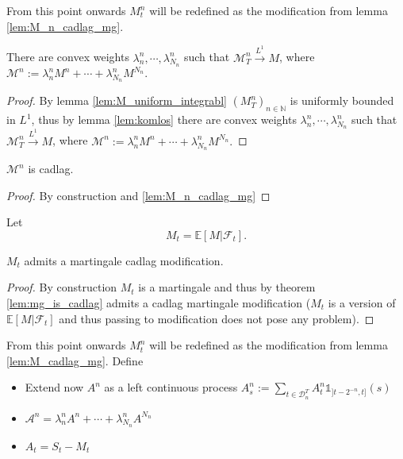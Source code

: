From this point onwards $M^n_t$ will be redefined as the modification from lemma \ref{lem:M_n_cadlag_mg}.
\begin{lemma}\label{lem:M_cal_converges_L1}
  There are convex weights $\lambda^n_n,\cdots,\lambda^n_{N_n}$ such that
  $\mathcal{M}^n_T\stackrel{L^1}{\rightarrow}M$, where $\mathcal{M}^n:=\lambda^n_nM^n+\cdots +\lambda^n_{N_n}M^{N_n}.$
\end{lemma}
\begin{proof}
  By lemma \ref{lem:M_uniform_integrabl} $(M^n_T)_{n\in\mathbb{N}}$ is uniformly bounded in $L^1$, thus by lemma \ref{lem:komlos} there are convex weights $\lambda^n_n,\cdots,\lambda^n_{N_n}$ such that
  $\mathcal{M}^n_T\stackrel{L^1}{\rightarrow}M$, where $\mathcal{M}^n:=\lambda^n_nM^n+\cdots +\lambda^n_{N_n}M^{N_n}.$
\end{proof}

\begin{lemma}\label{lem:M_cal_cadlag}
  $\mathcal{M}^n$ is cadlag.
\end{lemma}
\begin{proof}
  By construction and \ref{lem:M_n_cadlag_mg}
\end{proof}

Let \begin{equation}\label{equation_DM_e6} M_t = \mathbb{E}[M\vert\mathcal{F}_t].\end{equation}

\begin{lemma}\label{lem:M_cadlag_mg}
  $M_t$ admits a martingale cadlag modification.
\end{lemma}
\begin{proof}
  By construction $M_t$ is a martingale and thus by theorem \ref{lem:mg_is_cadlag} admits a cadlag martingale modification
  ($M_t$ is a version of $\mathbb{E}[M\vert\mathcal{F}_t]$ and thus passing to modification does not pose any problem).
\end{proof}

From this point onwards $M^n_t$ will be redefined as the modification from lemma \ref{lem:M_cadlag_mg}.
Define
\begin{itemize}
  \item Extend now $A^n$ as a left continuous process $A^n_s:=\sum_{t\in\mathcal{D}^T_n}A^n_t\mathbb{1}_{]t-2^{-n},t]}(s)$
  \item $\mathcal{A}^n=\lambda^n_nA^n+\cdots +\lambda^n_{N_n}A^{N_n}$
  \item $A_t=S_t-M_t$
\end{itemize}

